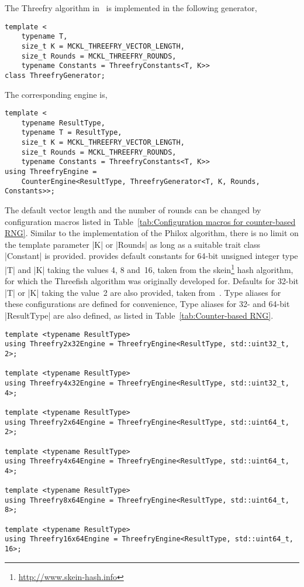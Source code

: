 The Threefry algorithm in~\cite{Salmon:2011um} is implemented in the following
generator,
\begin{Verbatim}
template <
    typename T,
    size_t K = MCKL_THREEFRY_VECTOR_LENGTH,
    size_t Rounds = MCKL_THREEFRY_ROUNDS,
    typename Constants = ThreefryConstants<T, K>>
class ThreefryGenerator;
\end{Verbatim}
The corresponding \rng engine is,
\begin{Verbatim}
template <
    typename ResultType,
    typename T = ResultType,
    size_t K = MCKL_THREEFRY_VECTOR_LENGTH,
    size_t Rounds = MCKL_THREEFRY_ROUNDS,
    typename Constants = ThreefryConstants<T, K>>
using ThreefryEngine =
    CounterEngine<ResultType, ThreefryGenerator<T, K, Rounds, Constants>>;
\end{Verbatim}
The default vector length and the number of rounds can be changed by
configuration macros listed in Table~\ref{tab:Configuration macros for
counter-based RNG}. Similar to the implementation of the Philox algorithm,
there is no limit on the template parameter |K| or |Rounds| as long as a
suitable trait class |Constant| is provided. \mckl provides default constants
for 64-bit unsigned integer type |T| and |K| taking the values 4, 8 and~16,
taken from the skein\footnote{\url{http://www.skein-hash.info}} hash algorithm,
for which the Threefish algorithm was originally developed for. Defaults for
32-bit |T| or |K| taking the value~2 are also provided, taken
from~\cite{Salmon:2011um}. Type aliases for these configurations are defined
for convenience, Type aliases for 32- and 64-bit |ResultType| are also defined,
as listed in Table~\ref{tab:Counter-based RNG}.
\begin{Verbatim}
template <typename ResultType>
using Threefry2x32Engine = ThreefryEngine<ResultType, std::uint32_t, 2>;

template <typename ResultType>
using Threefry4x32Engine = ThreefryEngine<ResultType, std::uint32_t, 4>;

template <typename ResultType>
using Threefry2x64Engine = ThreefryEngine<ResultType, std::uint64_t, 2>;

template <typename ResultType>
using Threefry4x64Engine = ThreefryEngine<ResultType, std::uint64_t, 4>;

template <typename ResultType>
using Threefry8x64Engine = ThreefryEngine<ResultType, std::uint64_t, 8>;

template <typename ResultType>
using Threefry16x64Engine = ThreefryEngine<ResultType, std::uint64_t, 16>;
\end{Verbatim}

